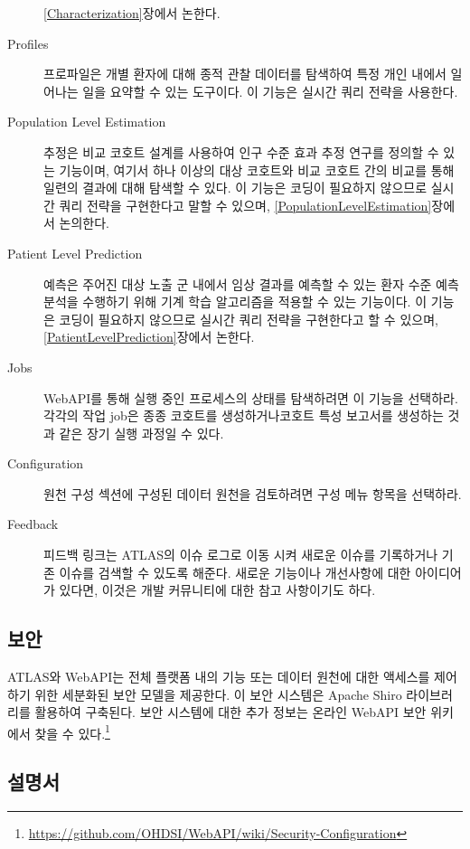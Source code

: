 \documentclass[10.5pt]{book}
\let\rmarkdownfootnote\footnote%
\def\footnote{\protect\rmarkdownfootnote}
\theoremstyle{definition}
\theoremstyle{definition}
\theoremstyle{definition}
\theoremstyle{remark}
\begin{document}
\begin{description}
\ref{Characterization}장에서 논한다.
\item[Profiles \index{ATLAS!profiles}]
프로파일은 개별 환자에 대해 종적 관찰 데이터를 탐색하여 특정 개인 내에서
일어나는 일을 요약할 수 있는 도구이다. 이 기능은 실시간 쿼리 전략을
사용한다.
\item[Population Level Estimation
\index{ATLAS!population level estimation}]
추정은 비교 코호트 설계를 사용하여 인구 수준 효과 추정 연구를 정의할 수
있는 기능이며, 여기서 하나 이상의 대상 코호트와 비교 코호트 간의 비교를
통해 일련의 결과에 대해 탐색할 수 있다. 이 기능은 코딩이 필요하지
않으므로 실시간 쿼리 전략을 구현한다고 말할 수 있으며,
\ref{PopulationLevelEstimation}장에서 논의한다.
\item[Patient Level Prediction \index{ATLAS!patient level prediction}]
예측은 주어진 대상 노출 군 내에서 임상 결과를 예측할 수 있는 환자 수준
예측 분석을 수행하기 위해 기계 학습 알고리즘을 적용할 수 있는 기능이다.
이 기능은 코딩이 필요하지 않으므로 실시간 쿼리 전략을 구현한다고 할 수
있으며, \ref{PatientLevelPrediction}장에서 논한다.
\item[Jobs \index{ATLAS!jobs}]
WebAPI를 통해 실행 중인 프로세스의 상태를 탐색하려면 이 기능을 선택하라.
각각의 작업 job은 종종 코호트를 생성하거나코호트 특성 보고서를 생성하는
것과 같은 장기 실행 과정일 수 있다.
\item[Configuration \index{ATLAS!configuration}]
원천 구성 섹션에 구성된 데이터 원천을 검토하려면 구성 메뉴 항목을
선택하라.
\item[Feedback \index{ATLAS!feedback}]
피드백 링크는 ATLAS의 이슈 로그로 이동 시켜 새로운 이슈를 기록하거나
기존 이슈를 검색할 수 있도록 해준다. 새로운 기능이나 개선사항에 대한
아이디어가 있다면, 이것은 개발 커뮤니티에 대한 참고 사항이기도 하다.
\end{description}

\subsection{보안}

ATLAS와 WebAPI는 전체 플랫폼 내의 기능 또는 데이터 원천에 대한 액세스를
제어하기 위한 세분화된 보안 모델을 제공한다. 이 보안 시스템은 Apache
Shiro 라이브러리를 활용하여 구축된다. 보안 시스템에 대한 추가 정보는
온라인 WebAPI 보안 위키에서 찾을 수 있다.\footnote{\url{https://github.com/OHDSI/WebAPI/wiki/Security-Configuration}}

\subsection{설명서}
\end{document}
